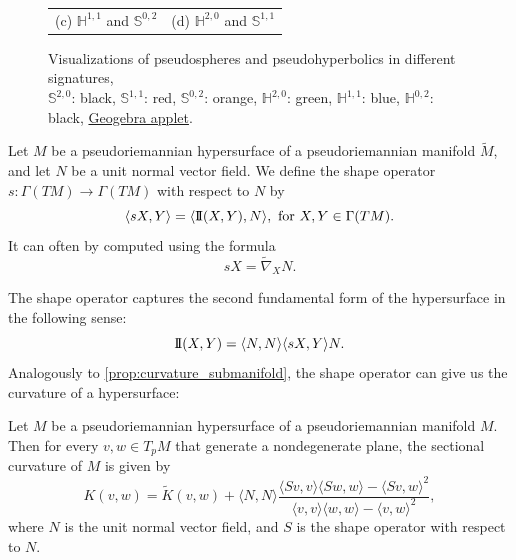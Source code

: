 \documentclass{report}
\begin{document}
\begin{figure}[ht]
\begin{tabular}{cc}
        \small (c) $\mathbb H^{1,1}$ and $\mathbb S^{0,2}$ &
        \small (d) $\mathbb H^{2,0}$ and $\mathbb S^{1,1}$
    \end{tabular}
    \caption{Visualizations of pseudospheres and pseudohyperbolics in different signatures,\\ $\mathbb S^{2,0}$: black, $\mathbb S^{1,1}$: red, $\mathbb S^{0,2}$: orange, $\mathbb H^{2,0}$: green, $\mathbb H^{1,1}$: blue, $\mathbb H^{0,2}$: black, \href{https://www.geogebra.org/m/rwsndb8h}{Geogebra applet}.}
    \label{fig:pseudospheres_grid}
\end{figure}
\begin{definition}
    Let $M$ be a pseudoriemannian hypersurface of a pseudoriemannian manifold $\tilde M$, and let $N$ be a unit normal vector field.
    We define the shape operator $s: \Gamma(TM) \to \Gamma(TM)$ with respect to $N$ by
    \[
    \langle s X, Y \rangle = \langle \operatorname{I\!I}(X,Y), N \rangle, \text{ for } X,Y \in \Gamma(TM).
    \]
    It can often by computed using the formula
    \[
    s X = \tilde \nabla_X N.
    \]
\end{definition}
The shape operator captures the second fundamental form of the hypersurface in the following sense:
\[
\operatorname{I\!I}(X,Y) = \langle N, N \rangle \langle s X, Y \rangle N.
\]
Analogously to \cref{prop:curvature_submanifold}, the shape operator can give us the curvature of a hypersurface:
\begin{proposition}\label{prop:curvature_hypersurface}
    Let $M$ be a pseudoriemannian hypersurface of a pseudoriemannian manifold $M$.
    Then for every $v, w \in T_p M$ that generate a nondegenerate plane, the sectional curvature of $M$ is given by
    \[
    K(v,w) = \tilde K(v,w) + \langle N, N \rangle \frac{\langle Sv ,v \rangle \langle Sw, w \rangle- \langle Sv, w \rangle^2}{ \langle v,v \rangle \langle w,w \rangle - \langle v,w \rangle^2},
    \]
    where $N$ is the unit normal vector field, and $S$ is the shape operator with respect to $N$.
\end{proposition}
\end{document}
